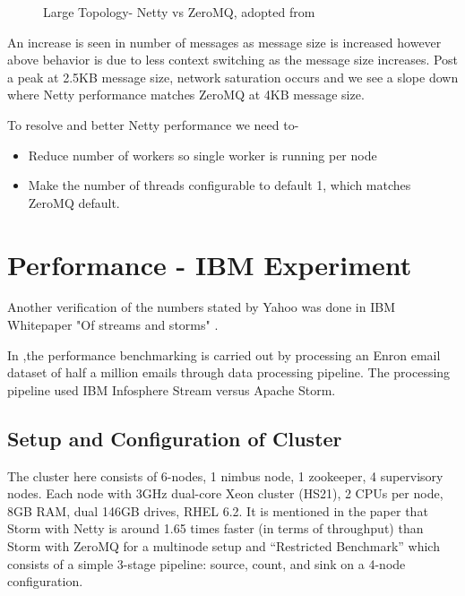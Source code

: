 \documentclass[9pt,twocolumn,twoside]{../../styles/osajnl}
\begin{document}
\begin{figure}[htbp]
	\centering
	\caption{Large Topology- Netty vs ZeroMQ, adopted from
          \cite{article-storm-netty}}
	\label{fig:NettyVsZMQFull}
\end{figure}

An increase is seen in number of messages as message size is increased
however above behavior is due to less context switching as the message
size increases. Post a peak at 2.5KB message size, network saturation
occurs and we see a slope down where Netty performance matches ZeroMQ
at 4KB message size.

To resolve and better Netty performance we need to-
\begin{itemize}
	\renewcommand{\labelitemi}{\scriptsize$\square$} 
	\item Reduce number of workers so single worker is running per
          node
        \item Make the number of threads configurable to default 1,
          which matches ZeroMQ default.
\end{itemize}

\section{Performance - IBM Experiment}
Another verification of the numbers stated by Yahoo was done in IBM
Whitepaper "Of streams and storms" \cite{article-nabi2014streams}.

In \cite{article-nabi2014streams},the performance benchmarking is
carried out by processing an Enron email dataset of half a million
emails through data processing pipeline. The processing pipeline used
IBM Infosphere Stream versus Apache Storm.

\subsection{Setup and Configuration of Cluster}
The cluster here consists of 6-nodes, 1 nimbus node, 1 zookeeper, 4
supervisory nodes. Each node with 3GHz dual-core Xeon cluster (HS21),
2 CPUs per node, 8GB RAM, dual 146GB drives, RHEL 6.2. It is mentioned
in the paper that Storm with Netty is around 1.65 times faster (in
terms of throughput) than Storm with ZeroMQ for a multinode setup and
“Restricted Benchmark” which consists of a simple 3-stage pipeline:
source, count, and sink on a 4-node configuration.
\end{document}

